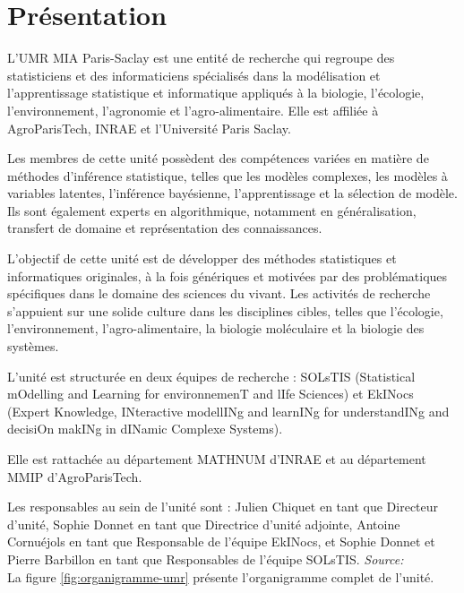 \section{Présentation}
L'UMR MIA Paris-Saclay est une entité de recherche qui regroupe des
statisticiens et des informaticiens spécialisés dans la modélisation et
l'apprentissage statistique et informatique appliqués à la biologie, l'écologie,
l'environnement, l'agronomie et l'agro-alimentaire. Elle est affiliée à
AgroParisTech, INRAE et l'Université Paris Saclay.

Les membres de cette unité possèdent des compétences variées en matière de
méthodes d'inférence statistique, telles que les modèles complexes, les modèles
à variables latentes, l'inférence bayésienne, l'apprentissage et la sélection de
modèle. Ils sont également experts en algorithmique, notamment en
généralisation, transfert de domaine et représentation des connaissances.

L'objectif de cette unité est de développer des méthodes statistiques et
informatiques originales, à la fois génériques et motivées par des
problématiques spécifiques dans le domaine des sciences du vivant. Les activités
de recherche s'appuient sur une solide culture dans les disciplines cibles,
telles que l'écologie, l'environnement, l'agro-alimentaire, la biologie
moléculaire et la biologie des systèmes.

L'unité est structurée en deux équipes de recherche : SOLsTIS (Statistical
mOdelling and Learning for environnemenT and lIfe Sciences) et EkINocs (Expert
Knowledge, INteractive modellINg and learnINg for understandINg and decisiOn
makINg in dINamic Complexe Systems).

Elle est rattachée au département MATHNUM d'INRAE et au département MMIP
d'AgroParisTech.

Les responsables au sein de l'unité sont : Julien Chiquet en tant que Directeur
d'unité, Sophie Donnet en tant que Directrice d'unité adjointe, Antoine
Cornuéjols en tant que Responsable de l'équipe EkINocs, et Sophie Donnet
et Pierre Barbillon en tant que Responsables de l'équipe SOLsTIS.
\newline
\emph{Source:~\cite{AccueilMIAParisSaclay}}\\
La figure \ref{fig:organigramme-umr} présente l'organigramme complet de l'unité.

\begin{sidewaysfigure}[h!]
    \begin{center}
        
        \caption{Organigramme de l'UMR}
        \label{fig:organigramme-umr}
    \end{center}
\end{sidewaysfigure}

